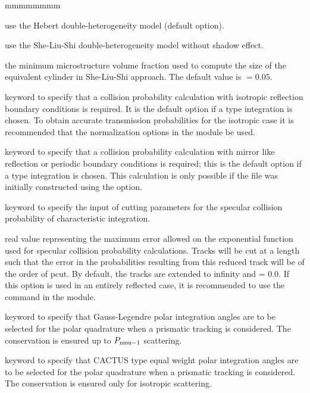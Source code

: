 \begin{ListeDeDescription}{mmmmmmmm}
\item[\moc{HEBE}] use the Hebert double-heterogeneity model (default option).\cite{BIHET}

\item[\moc{SLSI}] use the She-Liu-Shi double-heterogeneity model without shadow effect.\cite{She2017}

\item[\dusa{frtm}] the minimum microstructure volume fraction used to compute the size of the equivalent cylinder in She-Liu-Shi approach. The default value is  $=0.05$.

\item[\moc{PISO}] keyword to specify that a collision probability calculation with isotropic reflection boundary 
conditions is required. It is the default option if a  type integration is chosen. To obtain accurate
transmission probabilities for the isotropic case it is recommended that the normalization 
options in the  module be used. 

\item[\moc{PSPC}] keyword to specify that a collision probability calculation with mirror like reflection or periodic 
boundary conditions is required; this is the default option if a  type integration is chosen. 
This calculation is only possible if the file was initially constructed using the  option. 

\item[\moc{CUT}] keyword to specify the input of cutting parameters for the specular collision probability
of characteristic integration. 

\item[\dusa{pcut}] real value representing the maximum error allowed on the exponential function used
for specular collision probability calculations. Tracks will be cut at a length such that the error in the 
probabilities resulting from this reduced track will be of the order of pcut. By default, the tracks 
are extended to infinity and  = 0.0. If this option is used in an entirely reflected case, it is 
recommended to use the  command in the  module. 

\item[\moc{GAUS}] keyword to specify that Gauss-Legendre polar integration angles are to be selected for the polar quadrature when a prismatic tracking is considered. The conservation is ensured up to $P_{\dusa{nmu}-1}$ scattering.

\item[\moc{CACA}] keyword to specify that CACTUS type equal weight polar integration angles are to be
selected for the polar quadrature when a prismatic tracking is considered.\cite{CACTUS} The conservation is ensured only for isotropic scattering.


\end{ListeDeDescription}
